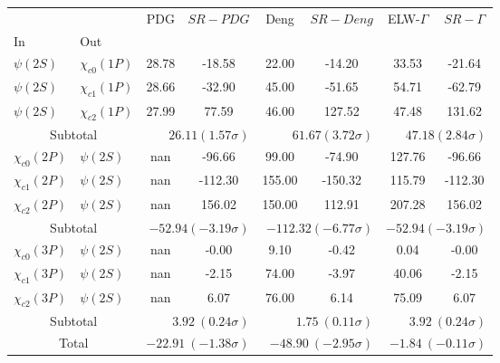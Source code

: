 \begin{tabular}{|l|l|c|c|c|c|c|c|}%
\hline%
&&PDG&$SR-PDG$&Deng&$SR-Deng$&ELW-$\Gamma$&$SR-\Gamma$\\%
In&Out&&&&&&\\%
\hline%
$\psi(2S)$&$\chi_{c0}(1P)$&28.78&-18.58&22.00&-14.20&33.53&-21.64\\%
$\psi(2S)$&$\chi_{c1}(1P)$&28.66&-32.90&45.00&-51.65&54.71&-62.79\\%
$\psi(2S)$&$\chi_{c2}(1P)$&27.99&77.59&46.00&127.52&47.48&131.62\\%
\hline%
\hline%
\multicolumn{2}{|c|}{Subtotal}&\multicolumn{2}{|r|}{$26.11 (1.57\sigma)$}&\multicolumn{2}{|r|}{$61.67 (3.72\sigma)$}&\multicolumn{2}{|r|}{$47.18 (2.84\sigma)$}\\%
\hline%
\hline%
$\chi_{c0}(2P)$&$\psi(2S)$&nan&-96.66&99.00&-74.90&127.76&-96.66\\%
$\chi_{c1}(2P)$&$\psi(2S)$&nan&-112.30&155.00&-150.32&115.79&-112.30\\%
$\chi_{c2}(2P)$&$\psi(2S)$&nan&156.02&150.00&112.91&207.28&156.02\\%
\hline%
\hline%
\multicolumn{2}{|c|}{Subtotal}&\multicolumn{2}{|r|}{$-52.94 (-3.19\sigma)$}&\multicolumn{2}{|r|}{$-112.32 (-6.77\sigma)$}&\multicolumn{2}{|r|}{$-52.94 (-3.19\sigma)$}\\%
\hline%
\hline%
$\chi_{c0}(3P)$&$\psi(2S)$&nan&-0.00&9.10&-0.42&0.04&-0.00\\%
$\chi_{c1}(3P)$&$\psi(2S)$&nan&-2.15&74.00&-3.97&40.06&-2.15\\%
$\chi_{c2}(3P)$&$\psi(2S)$&nan&6.07&76.00&6.14&75.09&6.07\\%
\hline%
\hline%
\multicolumn{2}{|c|}{Subtotal}&\multicolumn{2}{|r|}{$3.92~(0.24\sigma)$}&\multicolumn{2}{|r|}{$1.75~(0.11\sigma)$}&\multicolumn{2}{|r|}{$3.92~(0.24\sigma)$}\\%
\hline%
\hline%
\multicolumn{2}{|c|}{Total}&\multicolumn{2}{|r|}{$-22.91~(-1.38\sigma)$}&\multicolumn{2}{|r|}{$-48.90~(-2.95\sigma)$}&\multicolumn{2}{|r|}{$-1.84~(-0.11\sigma)$}\\%
\hline%
\end{tabular}
